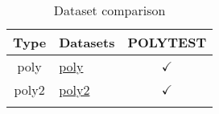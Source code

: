 \documentclass{article}
\begin{document}
\begin{longtable}{|c|l|c|}
\hline
\footnotesize
 Type & Datasets  & POLYTEST \\ \hline
\multirow{1}{*}{poly}
 & \href{https://arxiv.org}{poly}  & $\checkmark$
\\ \hline
\multirow{1}{*}{poly2}
 & \href{https://arxiv.org}{poly2}  & $\checkmark$
\\ \hline
\caption{Dataset comparison}
\end{longtable}
\end{document}
